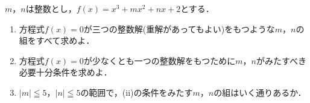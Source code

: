 \documentclass[../../main.tex]{subfiles}
\begin{document}
$m$，$n$は整数とし，$f(x)=x^3+mx^2+nx+2$とする．
\begin{enumerate}
  \item[(i)] 方程式$f(x)=0$が三つの整数解(重解があってもよい)をもつような$m$，$n$の組をすべて求めよ．
  \item[(ii)] 方程式$f(x)=0$が少なくとも一つの整数解をもつために$m$，$n$がみたすべき必要十分条件を求めよ．
  \item[(iii)] $|m|\leqq5$，$|n|\leqq5$の範囲で，(ii)の条件をみたす$m$，$n$の組はいく通りあるか．
\end{enumerate}
\end{document}
